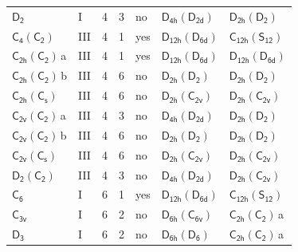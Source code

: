 \documentclass[10pt,a4paper]{article}
\numberwithin{equation}{section}
\newcommand{\grp}[1]{\mathsf{#1}}
\newcommand{\clsletter}[1]{\,{\scriptsize\color{black!55}#1}}
\begin{document}
{\begin{longtable}{@{}llrrlll@{}}
\href{../../../rotation/data/pdf/D2.pdf}{$\grp{D_{2}}$} & I & 4 & 3 & no & \href{D4h-D2d.pdf}{$\grp{D_{4h}}(\grp{D_{2d}})$} & \href{D2h-D2.pdf}{$\grp{D_{2h}}(\grp{D_{2}})$}\\
\href{C4-C2.pdf}{$\grp{C_{4}}(\grp{C_{2}})$} & III & 4 & 1 & yes & \href{D12h-D6d.pdf}{$\grp{D_{12h}}(\grp{D_{6d}})$} & \href{C12h-S12.pdf}{$\grp{C_{12h}}(\grp{S_{12}})$}\\
\href{C2h-C2.pdf}{$\grp{C_{2h}}(\grp{C_{2}})$}\clsletter{a} & III & 4 & 1 & yes & \href{D12h-D6d.pdf}{$\grp{D_{12h}}(\grp{D_{6d}})$} & \href{D12h-D6d.pdf}{$\grp{D_{12h}}(\grp{D_{6d}})$}\\
\href{C2h-C2.pdf}{$\grp{C_{2h}}(\grp{C_{2}})$}\clsletter{b} & III & 4 & 6 & no & \href{D2h-D2.pdf}{$\grp{D_{2h}}(\grp{D_{2}})$} & \href{D2h-D2.pdf}{$\grp{D_{2h}}(\grp{D_{2}})$}\\
\href{C2h-C1v.pdf}{$\grp{C_{2h}}(\grp{C_{s}})$} & III & 4 & 6 & no & \href{D2h-C2v.pdf}{$\grp{D_{2h}}(\grp{C_{2v}})$} & \href{D2h-C2v.pdf}{$\grp{D_{2h}}(\grp{C_{2v}})$}\\
\href{C2v-C2.pdf}{$\grp{C_{2v}}(\grp{C_{2}})$}\clsletter{a} & III & 4 & 3 & no & \href{D4h-D2d.pdf}{$\grp{D_{4h}}(\grp{D_{2d}})$} & \href{D2h-D2.pdf}{$\grp{D_{2h}}(\grp{D_{2}})$}\\
\href{C2v-C2.pdf}{$\grp{C_{2v}}(\grp{C_{2}})$}\clsletter{b} & III & 4 & 6 & no & \href{D2h-D2.pdf}{$\grp{D_{2h}}(\grp{D_{2}})$} & \href{D2h-D2.pdf}{$\grp{D_{2h}}(\grp{D_{2}})$}\\
\href{C2v-C1v.pdf}{$\grp{C_{2v}}(\grp{C_{s}})$} & III & 4 & 6 & no & \href{D2h-C2v.pdf}{$\grp{D_{2h}}(\grp{C_{2v}})$} & \href{D2h-C2v.pdf}{$\grp{D_{2h}}(\grp{C_{2v}})$}\\
\href{D2-C2.pdf}{$\grp{D_{2}}(\grp{C_{2}})$} & III & 4 & 3 & no & \href{D4h-D2d.pdf}{$\grp{D_{4h}}(\grp{D_{2d}})$} & \href{D2h-C2v.pdf}{$\grp{D_{2h}}(\grp{C_{2v}})$}\\
\href{../../../rotation/data/pdf/C6.pdf}{$\grp{C_{6}}$} & I & 6 & 1 & yes & \href{D12h-D6d.pdf}{$\grp{D_{12h}}(\grp{D_{6d}})$} & \href{C12h-S12.pdf}{$\grp{C_{12h}}(\grp{S_{12}})$}\\
\href{../../../rotation/data/pdf/C3v.pdf}{$\grp{C_{3v}}$} & I & 6 & 2 & no & \href{D6h-C6v.pdf}{$\grp{D_{6h}}(\grp{C_{6v}})$} & \href{C2h-C2.pdf}{$\grp{C_{2h}}(\grp{C_{2}})$}\clsletter{a}\\
\href{../../../rotation/data/pdf/D3.pdf}{$\grp{D_{3}}$} & I & 6 & 2 & no & \href{D6h-D6.pdf}{$\grp{D_{6h}}(\grp{D_{6}})$} & \href{C2h-C2.pdf}{$\grp{C_{2h}}(\grp{C_{2}})$}\clsletter{a}\\

\end{longtable}}
\end{document}
